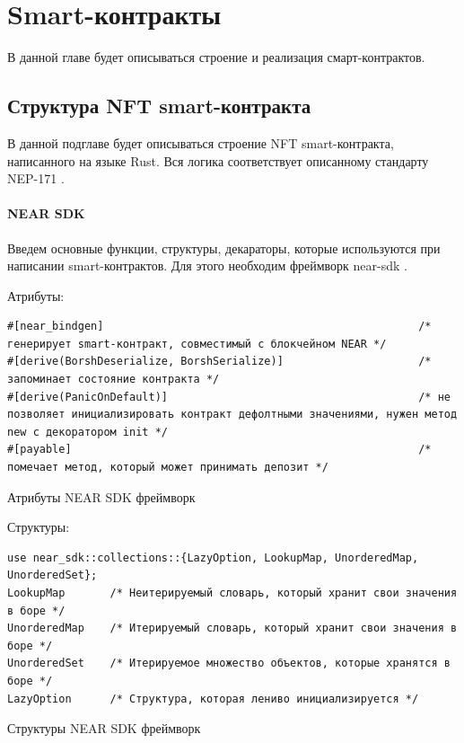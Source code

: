 \section{Smart-контракты}
\label{section.main.smart}

В данной главе будет описываться строение и реализация смарт-контрактов.

\subsection{Структура NFT smart-контракта}
\label{section.main.smart.struct}
В данной подглаве будет описываться строение NFT smart-контракта, написанного на языке Rust. Вся логика соответствует описанному стандарту NEP-171 \cite{nftstandart}.
\paragraph{NEAR SDK}
Введем основные функции, структуры, декараторы, которые используются при написании smart-контрактов. Для этого необходим фреймворк near-sdk \cite{nearsdkrs}.

Атрибуты:

\begin{listing}[H]
\begin{verbatim}
#[near_bindgen]                                                 /* генерирует smart-контракт, совместимый с блокчейном NEAR */
#[derive(BorshDeserialize, BorshSerialize)]                     /* запоминает состояние контракта */
#[derive(PanicOnDefault)]                                       /* не позволяет инициализировать контракт дефолтными значениями, нужен метод new с декоратором init */
#[payable]                                                      /* помечает метод, который может принимать депозит */
\end{verbatim}
\caption{Атрибуты NEAR SDK фреймворк}
\label{near.attributes}
\end{listing}

Структуры:

\begin{listing}[H]
\begin{verbatim}
use near_sdk::collections::{LazyOption, LookupMap, UnorderedMap, UnorderedSet};
LookupMap       /* Неитерируемый словарь, который хранит свои значения в боре */
UnorderedMap    /* Итерируемый словарь, который хранит свои значения в боре */
UnorderedSet    /* Итерируемое множество объектов, которые хранятся в боре */
LazyOption      /* Структура, которая лениво инициализируется */
\end{verbatim}
\caption{Структуры NEAR SDK фреймворк}
\label{near.structures}
\end{listing}

